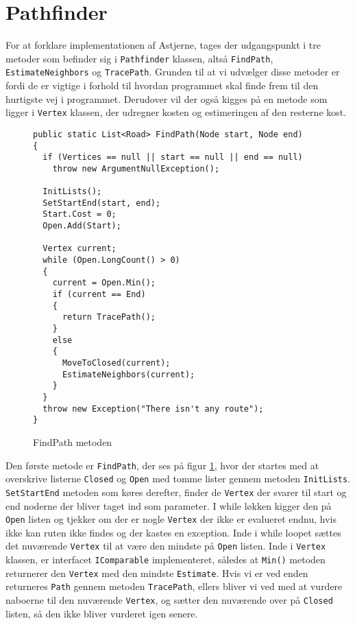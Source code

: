 \section{Pathfinder}\label{Pathfinder}
For at forklare implementationen af Astjerne, tages der udgangspunkt i tre metoder som befinder sig i \texttt{Pathfinder} klassen, altså \texttt{FindPath}, \texttt{EstimateNeighbors} og \texttt{TracePath}. Grunden til at vi udvælger disse metoder er fordi de er vigtige i forhold til hvordan programmet skal finde frem til den hurtigste vej i programmet. Derudover vil der også kigges på en metode som ligger i \texttt{Vertex} klassen, der udregner kosten og estimeringen af den resterne kost.

\begin{figure}[H]
\begin{lstlisting}
public static List<Road> FindPath(Node start, Node end)
{
  if (Vertices == null || start == null || end == null)
    throw new ArgumentNullException();

  InitLists();
  SetStartEnd(start, end);
  Start.Cost = 0;
  Open.Add(Start);

  Vertex current;
  while (Open.LongCount() > 0)
  {
    current = Open.Min();
    if (current == End)
    {
      return TracePath();
    } 
    else
    {
      MoveToClosed(current);
      EstimateNeighbors(current);
    }
  }
  throw new Exception("There isn't any route");
}
\end{lstlisting}
\caption{FindPath metoden}\label{FindPathCode}
\end{figure}

Den første metode er \texttt{FindPath}, der ses på figur \ref{FindPathCode}, hvor der startes med at overskrive listerne \texttt{Closed} og \texttt{Open} med tomme lister gennem metoden \texttt{InitLists}. \texttt{SetStartEnd} metoden som køres derefter, finder de \texttt{Vertex} der svarer til start og end noderne der bliver taget ind som parameter. I while løkken kigger den på \texttt{Open} listen og tjekker om der er nogle \texttt{Vertex} der ikke er evalueret endnu, hvis ikke kan ruten ikke findes og der kastes en exception. Inde i while loopet sættes det nuværende \texttt{Vertex} til at være den mindste på \texttt{Open} listen. Inde i \texttt{Vertex} klassen, er interfacet \texttt{IComparable} implementeret, således at \texttt{Min()} metoden returnerer den \texttt{Vertex} med den mindste \texttt{Estimate}. Hvis vi er ved enden returneres \texttt{Path} gennem metoden \texttt{TracePath}, ellers bliver vi ved med at vurdere naboerne til den nuværende \texttt{Vertex}, og sætter den nuværende over på \texttt{Closed} listen, så den ikke bliver vurderet igen senere.

